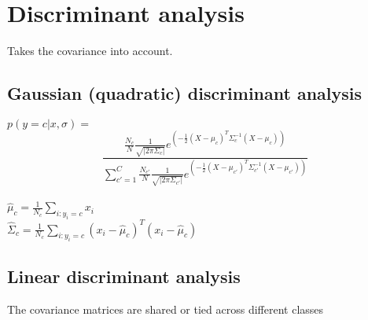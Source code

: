 \section{Discriminant analysis}
Takes the covariance into account.
\subsection{Gaussian (quadratic) discriminant analysis}
$p(y=c|x,\sigma)=$\\
\[
	\frac{\frac{N_c}{N}\frac{1}{\sqrt{|2\pi\Sigma_{c}|}}e^{(-\frac{1}{2}(X-\mu_{c})^{T}\Sigma_{c}^{-1}(X-\mu_{c}))}}{\sum_{c'=1}^{C}\frac{N_{c'}}{N}\frac{1}{\sqrt{|2\pi\Sigma_{c'}|}}e^{(-\frac{1}{2}(X-\mu_{c'})^{T}\Sigma_{c'}^{-1}(X-\mu_{c'}))}}
\]\\ $\hat{\mu}_{c}=\frac{1}{N_{c}}\sum_{i:y_i=c}x_{i}$\\
$\hat{\Sigma}_{c}=\frac{1}{N_{c}}\sum_{i:y_i=c}(x_{i}- \hat{\mu}_{c})^{T}(x_{i}-
\hat{\mu}_{c})$\\
\subsection{Linear discriminant analysis}
The covariance matrices are shared or tied across different classes